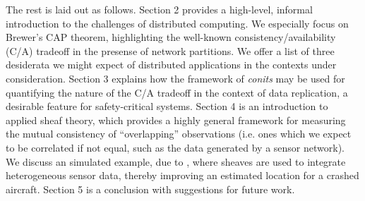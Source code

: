The rest is laid out as follows. Section 2 provides a high-level,
informal introduction to the challenges of distributed computing. We
especially focus on Brewer's CAP theorem, highlighting the well-known
consistency/availability (C/A) tradeoff in the presense of network
partitions. We offer a list of three desiderata we might expect of
distributed applications in the contexts under consideration.  Section
3 explains how the framework of \emph{conits} \cite{} may be used for
quantifying the nature of the C/A tradeoff in the context of data
replication, a desirable feature for safety-critical systems. Section
4 is an introduction to applied sheaf theory, which provides a highly
general framework for measuring the mutual consistency of
``overlapping'' observations (i.e. ones which we expect to be
correlated if not equal, such as the data generated by a sensor
network). We discuss an simulated example, due to \cite{}, where
sheaves are used to integrate heterogeneous sensor data, thereby
improving an estimated location for a crashed aircraft. Section 5 is a
conclusion with suggestions for future work.

